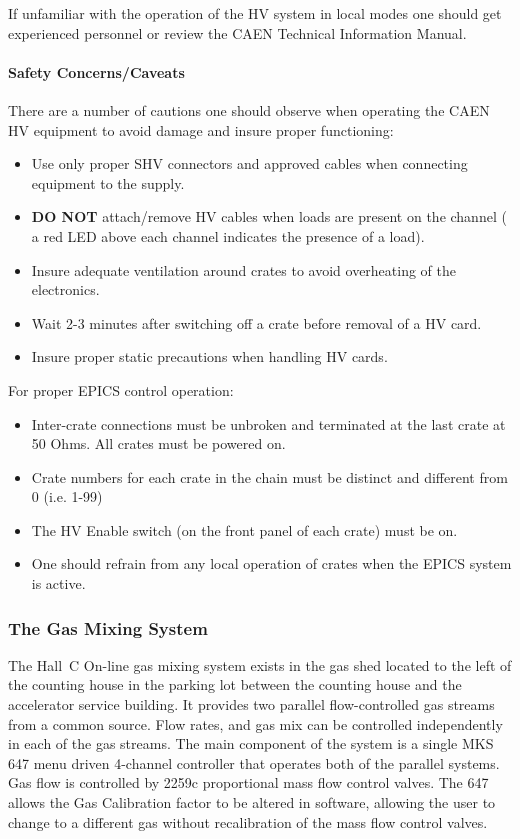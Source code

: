 If unfamiliar with the operation of the HV system in local modes
one should get experienced personnel or review the CAEN Technical
Information Manual.

\paragraph{Safety Concerns/Caveats}

There are a number of cautions one should observe when operating
the CAEN HV equipment to avoid damage and insure proper functioning:

\begin{itemize}
\item{Use only proper SHV connectors and approved cables when
connecting equipment to the supply.}
\item{{\bf DO NOT} attach/remove HV cables when loads are present on the
channel ( a red LED above each channel indicates the presence of a
load).}
\item{Insure adequate ventilation around crates to avoid overheating
of the electronics.}
\item{Wait 2-3 minutes after switching off a crate before removal of a
HV card.}
\item{Insure proper static precautions when handling HV cards.}
\end{itemize}

For proper EPICS control operation:

\begin{itemize}
\item{Inter-crate connections must be unbroken and terminated at the
last crate at 50 Ohms.  All crates must be powered on.}
\item{Crate numbers for each crate in the chain must be distinct and
different from 0 (i.e. 1-99)}
\item{The HV Enable switch (on the front panel of each crate) must be on.}
\item{One should refrain from any local operation of crates when the
EPICS system is active.}
\end{itemize}

\subsubsection{The Gas Mixing System}

The Hall~C On-line gas mixing system exists in the gas shed located
to the left of the counting house in the parking lot between the counting house
and the accelerator service building.
It provides two parallel
flow-controlled gas streams from a common source.  Flow rates, and gas mix
can be controlled independently in each of the gas streams.  The main
component of the system is a single MKS 647 menu driven 4-channel
controller that operates both of the parallel systems.  Gas flow is
controlled by 2259c proportional mass flow control valves.  The 647 allows
the Gas Calibration factor to be altered in software, allowing the user to
change to a different gas without recalibration of the mass flow control
valves.

